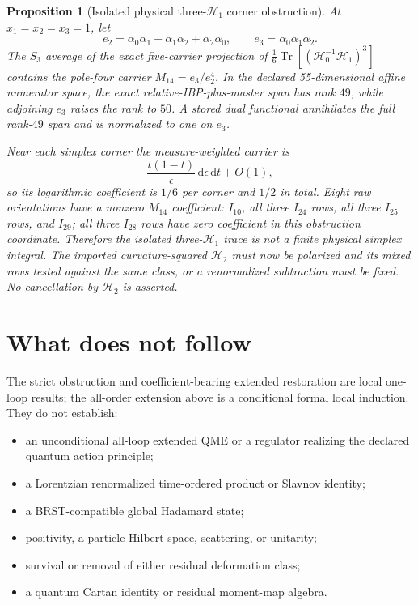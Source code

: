 \documentclass[11pt]{article}
\newtheorem{proposition}[theorem]{Proposition}
\theoremstyle{definition}
\theoremstyle{remark}
\newcommand{\dd}{\mathrm d}
\begin{document}
\begin{proposition}[Isolated physical three-$\mathcal H_1$ corner obstruction]
At $x_1=x_2=x_3=1$, let
\[
 e_2=\alpha_0\alpha_1+\alpha_1\alpha_2+\alpha_2\alpha_0,
 \qquad e_3=\alpha_0\alpha_1\alpha_2.
\]
The $S_3$ average of the exact five-carrier projection of
$\tfrac16\operatorname{Tr}[(\mathcal H_0^{-1}\mathcal H_1)^3]$
contains the pole-four carrier $M_{14}=e_3/e_2^4$.  In the declared
55-dimensional affine numerator space, the exact relative-IBP-plus-master
span has rank $49$, while adjoining $e_3$ raises the rank to $50$.  A stored
dual functional annihilates the full rank-$49$ span and is normalized to one
on $e_3$.

Near each simplex corner the measure-weighted carrier is
\[
 \frac{t(1-t)}{\epsilon}\,\dd\epsilon\,\dd t+O(1),
\]
so its logarithmic coefficient is $1/6$ per corner and $1/2$ in total.
Eight raw orientations have a nonzero $M_{14}$ coefficient: $I_{10}$, all
three $I_{24}$ rows, all three $I_{25}$ rows, and $I_{29}$; all three
$I_{28}$ rows have zero coefficient in this obstruction coordinate.
Therefore the isolated three-$\mathcal H_1$ trace is not a finite physical
simplex integral.  The imported curvature-squared $\mathcal H_2$ must now be
polarized and its mixed rows tested against the same class, or a renormalized
subtraction must be fixed.  No cancellation by $\mathcal H_2$ is asserted.
\end{proposition}

\section{What does not follow}

The strict obstruction and coefficient-bearing extended restoration are
local one-loop results; the all-order extension above is a conditional formal
local induction.  They do not establish:
\begin{itemize}
\item an unconditional all-loop extended QME or a regulator realizing the
declared quantum action principle;
\item a Lorentzian renormalized time-ordered product or Slavnov identity;
\item a BRST-compatible global Hadamard state;
\item positivity, a particle Hilbert space, scattering, or unitarity;
\item survival or removal of either residual deformation class;
\item a quantum Cartan identity or residual moment-map algebra.
\end{itemize}
\end{document}

